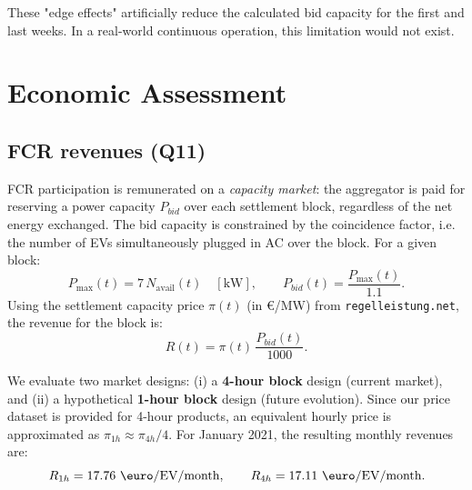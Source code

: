 \documentclass{article}
\begin{document}
These "edge effects" artificially reduce the calculated bid capacity for the first and last weeks. In a real-world continuous operation, this limitation would not exist.

\section{Economic Assessment}

\subsection{FCR revenues (Q11)}
FCR participation is remunerated on a \textit{capacity market}: the aggregator is paid for reserving a power capacity $P_{bid}$ over each settlement block, regardless of the net energy exchanged. The bid capacity is constrained by the coincidence factor, i.e. the number of EVs simultaneously plugged in AC over the block. For a given block:
\begin{equation}
    P_{\max}(t) = 7\,N_{\text{avail}}(t) \quad [\text{kW}], \qquad
    P_{bid}(t) = \frac{P_{\max}(t)}{1.1}.
\end{equation}
Using the settlement capacity price $\pi(t)$ (in \euro/MW) from \texttt{regelleistung.net}, the revenue for the block is:
\begin{equation}
    R(t) = \pi(t)\,\frac{P_{bid}(t)}{1000}.
\end{equation}

We evaluate two market designs: (i) a \textbf{4-hour block} design (current market), and (ii) a hypothetical \textbf{1-hour block} design (future evolution). Since our price dataset is provided for 4-hour products, an equivalent hourly price is approximated as $\pi_{1h}\approx \pi_{4h}/4$.
For January 2021, the resulting monthly revenues are:
\begin{equation}
    R_{1h} = 17.76~\text{\euro/EV/month}, \qquad
    R_{4h} = 17.11~\text{\euro/EV/month}.
\end{equation}
\end{document}
